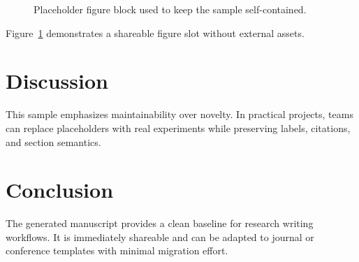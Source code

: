\documentclass[11pt]{article}
\begin{document}
\begin{figure}[t]
  \centering
  \fbox{\rule{0pt}{1.2in}\rule{0.9\linewidth}{0pt}}
  \caption{Placeholder figure block used to keep the sample self-contained.}
  \label{fig:placeholder}
\end{figure}

Figure~\ref{fig:placeholder} demonstrates a shareable figure slot without external assets.

\section{Discussion}
This sample emphasizes maintainability over novelty.
In practical projects, teams can replace placeholders with real experiments while preserving labels, citations, and section semantics.

\section{Conclusion}
The generated manuscript provides a clean baseline for research writing workflows.
It is immediately shareable and can be adapted to journal or conference templates with minimal migration effort.



\end{document}
